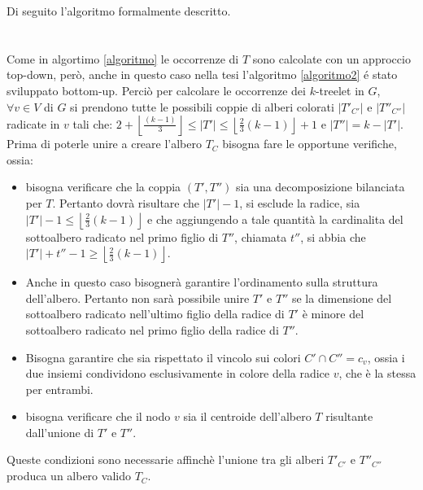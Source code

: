 Di seguito l'algoritmo formalmente descritto.\\\\  
\mbox{}\\

Come in algortimo \ref{algoritmo} le occorrenze di $ T $ sono calcolate con un approccio top-down,  per\`o, anche in questo caso nella tesi l'algoritmo \ref{algoritmo2} \'e stato sviluppato bottom-up.
Perci\`o per calcolare le occorrenze dei $ k $-treelet in $ G $, $ \forall v \in V $ di $ G $ si prendono tutte le possibili coppie di alberi colorati $ |T'_{C'}| $ e $ |T''_{C''}| $ radicate in $ v $ tali che: $ 2+ \left\lfloor \frac{(k-1)}{3}  \right\rfloor \le |T'| \le \left\lfloor \frac{2}{3}(k-1) \right\rfloor  +1 $ e $ |T''| = k-|T'| $.
Prima di poterle unire a creare l'albero $ T_C $ bisogna fare le opportune verifiche, ossia:
\begin{itemize}
	\item bisogna verificare che la coppia $ (T',T'') $ sia una decomposizione bilanciata per $ T $.
	Pertanto dovr\`a risultare che $ |T'|-1 $, si esclude la radice, sia  
	$ |T'| - 1 \le \left\lfloor\frac{2}{3}(k-1)\right\rfloor $ e che aggiungendo a tale quantit\`a la cardinalita del sottoalbero radicato nel primo figlio di $ T'' $, chiamata $ t'' $, si abbia che $ |T'| + t'' - 1 \ge \left\lfloor\frac{2}{3}(k-1)\right\rfloor $.
	\item Anche in questo caso bisogner\`a garantire l'ordinamento sulla struttura dell'albero.
	Pertanto non sar\`a possibile unire $ T' $ e $ T'' $ se la dimensione del sottoalbero radicato nell'ultimo figlio della radice di $ T' $ \`e minore del sottoalbero radicato nel primo figlio della radice di $ T'' $.
	\item Bisogna garantire che sia rispettato il vincolo sui colori $ C' \cap C'' = c_v$, ossia i due insiemi condividono esclusivamente in colore della radice $ v $, che \`e la stessa per entrambi. 
	\item bisogna verificare che il nodo $ v $ sia il centroide dell'albero $ T $ risultante dall'unione di $ T' $ e $ T'' $.
\end{itemize}
Queste condizioni sono necessarie affinch\`e l'unione tra gli alberi $ T'_{C'} $ e $ T''_{C''} $ produca un albero valido $ T_C $.

